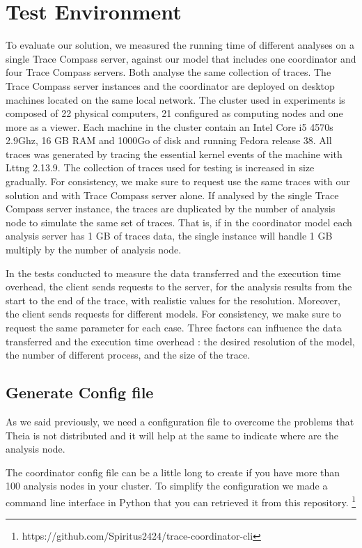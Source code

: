 \section{Test Environment}

To evaluate our solution, we measured the running time of different analyses on a single Trace Compass server, against our model that includes one coordinator and four Trace Compass servers. Both analyse the same collection of traces. The Trace Compass server instances and the coordinator are deployed on desktop machines located on the same local network. The cluster used in experiments is composed of 22 physical computers, 21 configured as computing nodes and one more as a viewer. Each machine in the cluster contain an Intel Core i5 4570s 2.9Ghz, 16 GB RAM and 1000Go of disk and running Fedora release 38. All traces was generated by tracing the essential kernel events of the machine with Lttng 2.13.9. The collection of traces used for testing is increased in size gradually. For consistency, we make sure to request use the same traces with our solution and with Trace Compass server alone. If analysed by the single Trace Compass server instance, the traces are duplicated by the number of analysis node to simulate the same set of traces. That is, if in the coordinator model each analysis server has 1 GB of traces data, the single instance will handle 1 GB multiply by the number of analysis node.

In the tests conducted to measure the data transferred and the execution time overhead, the client sends requests to the server, for the analysis results from the start to the end of the trace, with realistic values for the resolution. Moreover, the client sends requests for different models. For consistency, we make sure to request the same parameter for each case. Three factors can influence the data transferred and the execution time overhead : the desired resolution of the model, the number of different process, and the size of the trace.

\subsection{Generate Config file}

As we said previously, we need a configuration file to overcome the problems that Theia is not distributed and it will help at the same to indicate where are the analysis node. 

The coordinator config file can be a little long to create if you have more than 100 analysis nodes in your cluster. To simplify the configuration we made a command line interface in Python that you can retrieved it from this repository. \footnote{https://github.com/Spiritus2424/trace-coordinator-cli}


